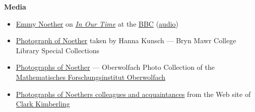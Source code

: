 \textbf{Media}

\begin{itemize}
\tightlist
\item
  {\href{https://www.bbc.co.uk/programmes/m00025bw}{Emmy Noether}{ on }\href{https://en.wikipedia.org/wiki/In_Our_Time_(radio_series)}{\emph{In Our Time}}{ at the }\href{https://en.wikipedia.org/wiki/BBC}{BBC} (\href{https://en.wikipedia.org/wiki/Digital_audio}{audio})}
\item
  {\href{https://triarte.brynmawr.edu/objects-1/info/188671}{Photograph of Noether} taken by Hanna Kunsch --- Bryn Mawr College Library Special Collections}
\item
  {\href{https://owpdb.mfo.de/search?term=noether}{Photographs of Noether} --- Oberwolfach Photo Collection of the \href{https://en.wikipedia.org/wiki/Mathematisches_Forschungsinstitut_Oberwolfach}{Mathematisches Forschungsinstitut Oberwolfach}}
\item
  {\href{https://faculty.evansville.edu/ck6/bstud/enmc.html}{Photographs of Noether\textquotesingle s colleagues and acquaintances} from the Web site of \href{https://en.wikipedia.org/wiki/Clark_Kimberling}{Clark Kimberling}}
\end{itemize}



{}
